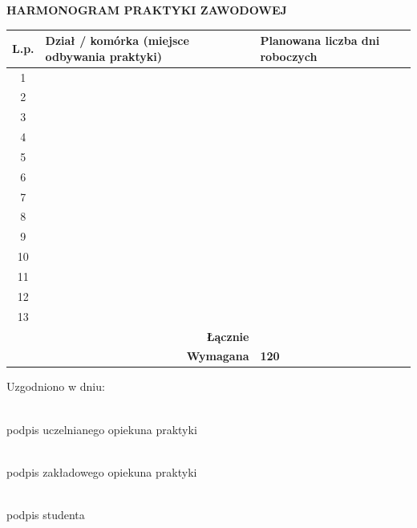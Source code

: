 \documentclass[11pt,a4paper]{article}
\begin{document}
\newpage

\begin{center}
\textbf{HARMONOGRAM PRAKTYKI ZAWODOWEJ}
\end{center}

\begin{center}
\renewcommand{\arraystretch}{1.5}
\begin{tabular}{|c|p{8cm}|p{4cm}|}
\hline
\textbf{L.p.} & \textbf{Dział / komórka (miejsce odbywania praktyki)} & \textbf{Planowana liczba dni roboczych} \\ \hline
1 & & \\ \hline
2 & & \\ \hline
3 & & \\ \hline
4 & & \\ \hline
5 & & \\ \hline
6 & & \\ \hline
7 & & \\ \hline
8 & & \\ \hline
9 & & \\ \hline
10 & & \\ \hline
11 & & \\ \hline
12 & & \\ \hline
13 & & \\ \hline
\multicolumn{2}{|r|}{\textbf{Łącznie}} & \\ \hline
\multicolumn{2}{|r|}{\textbf{Wymagana}} & \textbf{120} \\ \hline
\end{tabular}
\end{center}

\vspace{3em}
\noindent Uzgodniono w dniu: \dotfill

\vspace{4em}
\noindent
\begin{minipage}[t]{0.3\textwidth}
\centering
\dotfill\\
\small podpis uczelnianego opiekuna praktyki
\end{minipage}
\hfill
\begin{minipage}[t]{0.3\textwidth}
\centering
\dotfill\\
\small podpis zakładowego opiekuna praktyki
\end{minipage}
\hfill
\begin{minipage}[t]{0.3\textwidth}
\centering
\dotfill\\
\small podpis studenta
\end{minipage}
\end{document}
